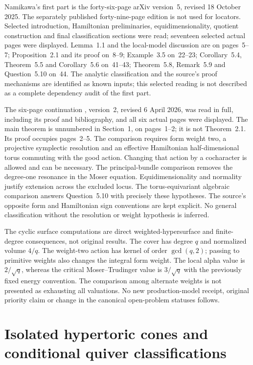 Namikawa's first part
\cite{Namikawa25HypertoricCharacterizationV5} is the
forty-six-page arXiv version~5, revised 18 October 2025.
The separately published forty-nine-page edition is not used for
locators. Selected introduction, Hamiltonian preliminaries,
equidimensionality, quotient construction and final classification
sections were read; seventeen selected actual pages were displayed.
Lemma~1.1 and the local-model discussion are on pages~5--7;
Proposition~2.1 and its proof on~8--9; Example~3.5 on~22--23;
Corollary~5.4, Theorem~5.5 and Corollary~5.6 on~41--43;
Theorem~5.8, Remark~5.9 and Question~5.10 on~44.
The analytic classification and the source's proof mechanisms are
identified as known inputs; this selected reading is not described
as a complete dependency audit of the first part.

The six-page continuation
\cite{Namikawa26HypertoricCharacterizationIIV2}, version~2,
revised 6 April 2026, was read in full, including its proof and
bibliography, and all six actual pages were displayed. The main
theorem is unnumbered in Section~1, on pages~1--2; it is not
Theorem~2.1. Its proof occupies pages~2--5. The comparison requires
form weight two, a projective symplectic resolution and an effective
Hamiltonian half-dimensional torus commuting with the good action.
Changing that action by a cocharacter is allowed and can be necessary.
The principal-bundle comparison removes the degree-one resonance
in the Moser equation. Equidimensionality and normality justify
extension across the excluded locus. The torus-equivariant
algebraic comparison answers Question~5.10 with precisely these
hypotheses. The source's opposite form and Hamiltonian sign
conventions are kept explicit. No general classification without
the resolution or weight hypothesis is inferred.

The cyclic surface computations are direct weighted-hypersurface
and finite-degree consequences, not original results. The cover
has degree $q$ and normalized volume $4/q$. The weight-two action
has kernel of order $\gcd(q,2)$; passing to primitive weights also
changes the integral form weight. The local alpha value is
$2/\sqrt q$, whereas the critical Moser--Trudinger value is
$3/\sqrt q$ with the previously fixed energy convention. The
comparison among alternate weights is not presented as exhausting
all valuations. No new production-model receipt, original priority
claim or change in the canonical open-problem statuses follows.

\section{Isolated hypertoric cones and conditional quiver classifications}
\label{sec:provenance-isolated-hypertoric}

